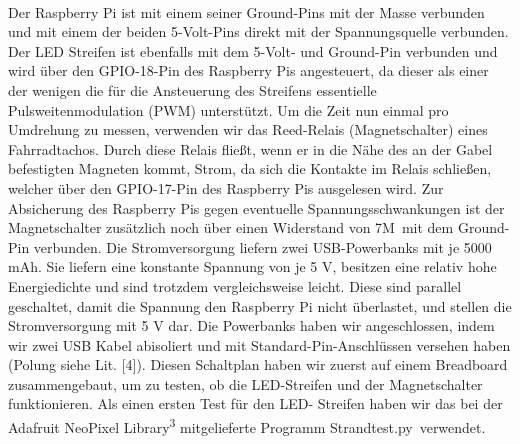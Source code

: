 \documentclass [a4paper, 11pt] {article}
\begin{document}
\\
Der Raspberry Pi ist mit einem seiner Ground-Pins mit der Masse verbunden und mit einem der beiden 5-Volt-Pins direkt mit der Spannungsquelle verbunden. Der LED Streifen ist ebenfalls mit dem 5-Volt- und Ground-Pin verbunden und wird über den GPIO-18-Pin des Raspberry Pis angesteuert, da dieser als einer der wenigen die für die Ansteuerung des Streifens essentielle Pulsweitenmodulation (PWM) unterstützt. Um die Zeit nun einmal pro Umdrehung zu messen, verwenden wir das Reed-Relais (Magnetschalter) eines Fahrradtachos. Durch diese Relais fließt, wenn er in die Nähe des an der Gabel befestigten Magneten kommt, Strom, da sich die Kontakte im Relais schließen, welcher über den GPIO-17-Pin des Raspberry Pis ausgelesen wird. Zur Absicherung des Raspberry Pis gegen eventuelle Spannungsschwankungen ist der Magnetschalter zusätzlich noch über einen Widerstand von 7M\textOmega\ mit dem Ground-Pin verbunden. Die Stromversorgung liefern zwei USB-Powerbanks mit je 5000 mAh. Sie liefern eine konstante Spannung von je 5 V, besitzen eine relativ hohe Energiedichte und sind trotzdem vergleichsweise leicht. Diese sind parallel geschaltet, damit die Spannung den Raspberry Pi nicht überlastet, und stellen die Stromversorgung mit 5 V dar. Die Powerbanks haben wir angeschlossen, indem wir zwei USB Kabel abisoliert und mit Standard-Pin-Anschlüssen versehen haben (Polung siehe Lit. [4]). Diesen Schaltplan haben wir zuerst auf einem Breadboard zusammengebaut, um zu testen, ob die LED-Streifen und der Magnetschalter funktionieren. Als einen ersten Test für den LED- Streifen haben wir das bei der Adafruit NeoPixel Library\textsuperscript{3} mitgelieferte Programm \glqq Strandtest.py\grqq\ verwendet.
\end{document}
